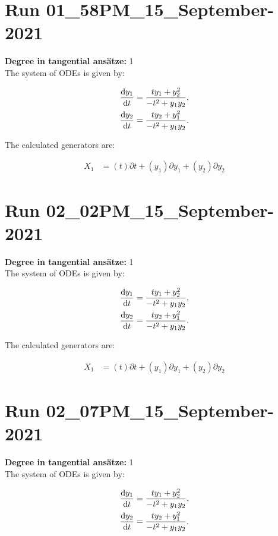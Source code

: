 \section*{Run 01\_58PM\_15\_September-2021}
\textbf{Degree in tangential ansätze:}	1\\
The system of ODEs is given by:

\begin{align*}
\dv{y_{1}}{t}&=\frac{t y_{1} + y_{2}^{2}}{- t^{2} + y_{1} y_{2}},\\
\dv{y_{2}}{t}&=\frac{t y_{2} + y_{1}^{2}}{- t^{2} + y_{1} y_{2}}.\\
\end{align*}

\noindent The calculated generators are:

\begin{align*}
X_{1}&=\left( t \right)\partial t+\left( y_{1} \right)\partial y_{1}+\left( y_{2} \right)\partial y_{2}\end{align*}
\section*{Run 02\_02PM\_15\_September-2021}
\textbf{Degree in tangential ansätze:}	1\\
The system of ODEs is given by:

\begin{align*}
\dv{y_{1}}{t}&=\frac{t y_{1} + y_{2}^{2}}{- t^{2} + y_{1} y_{2}},\\
\dv{y_{2}}{t}&=\frac{t y_{2} + y_{1}^{2}}{- t^{2} + y_{1} y_{2}}.\\
\end{align*}

\noindent The calculated generators are:

\begin{align*}
X_{1}&=\left( t \right)\partial t+\left( y_{1} \right)\partial y_{1}+\left( y_{2} \right)\partial y_{2}\end{align*}
\section*{Run 02\_07PM\_15\_September-2021}
\textbf{Degree in tangential ansätze:}	1\\
The system of ODEs is given by:

\begin{align*}
\dv{y_{1}}{t}&=\frac{t y_{1} + y_{2}^{2}}{- t^{2} + y_{1} y_{2}},\\
\dv{y_{2}}{t}&=\frac{t y_{2} + y_{1}^{2}}{- t^{2} + y_{1} y_{2}}.\\
\end{align*}

